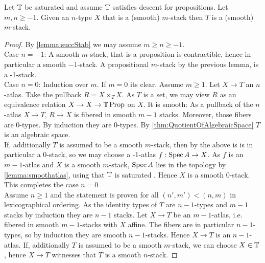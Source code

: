\documentclass{article}
\begin{document}
\begin{theorem}
    Let $\mathbb{T}$ be saturated and assume $\mathbb{T}$ satisfies descent for propositions. Let $m , n \ge -1$. Given an $n$-type $X$ that is a  (smooth) $m$-stack then $T$ is a  (smooth) $m$-stack.
\end{theorem}
\begin{proof}
    By \ref{lemma:succStab} we may assume $m \ge n \ge -1$. \\
    Case $n=-1$: A smooth $m$-stack, that is a proposition is contractible, hence in particular a smooth $-1$-stack. A propositional  $m$-stack by the previous lemma, is a  -1-stack. \\
    Case $n =0$: Induction over $m$. If $m=0$ its clear. Assume $m \ge 1$. Let $X \to T$ an $n$-atlas. Take the pullback $R = X \times_T X$. As $T$ is a set, we may view $R$ as an equivalence relation $X \to X \to \mathbb{T} \operatorname{Prop}$ on $X$. It is smooth: As a pullback of the $n$-atlas $X \to T$, $R \to X$ is fibered in smooth $m-1$ stacks. Moreover, those fibers are 0-types. By induction they are 0-types. By \ref{thm:QuotientOfAlgebraicSpace} $T$ is an algebraic space. \\
    If, additionally $T$ is assumed to be a smooth $m$-stack, then by the above is is in particular a  0-stack, so we may choose a -1-atlas $f : \operatorname{Spec} A \to X$. As $f$ is an $m-1$-atlas and $X$ is a smooth $m$-stack, $\operatorname{Spec} A$ lies in the topology by \ref{lemma:smoothatlas}, using that $\mathbb{T}$ is saturated . Hence $X$ is a smooth 0-stack. This completes the case $n=0$ \\
    Assume $n \ge 1$ and the statement is proven for all $(n',m') < (n,m)$ in lexicographical ordering. As the identity types of $T$ are $n-1$-types and  $m-1$ stacks by induction they are  $n-1$ stacks. Let $X \to T$ be an $m-1$-atlas, i.e. fibered in smooth $m-1$-stacks with $X$ affine. The fibers are in particular $n-1$-types, so by induction they are smooth $n-1$-stacks. Hence $X \to T$ is an $n-1$-atlas. If, additionally $T$ is assumed to be a smooth $m$-stack, we can choose $X \in \mathbb{T}$, hence $X \to T$ witnesses that $T$ is a smooth $n$-stack.
    
\end{proof}
\end{document}
